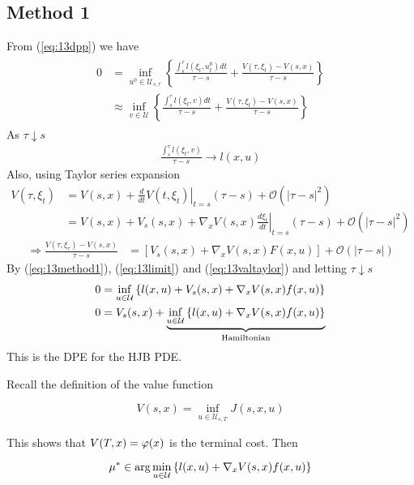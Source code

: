 \subsection{Method 1}
From (\ref{eq:13dpp}) we have
\begin{align}
\label{eq:13method1}
\begin{split}
0 &= \inf_{u^0\in\mathcal{U}_{s,\tau}} \left\lbrace \frac{\int_s^\tau l(\xi_t,u_t^0)dt}{\tau-s} + \frac{V(\tau,\xi_t)-V(s,x)}{\tau-s} \right\rbrace \\
&\approx\inf_{v\in\mathcal{U}} \left\lbrace \frac{\int_s^\tau l(\xi_t,v)dt}{\tau-s} + \frac{V(\tau,\xi_t)-V(s,x)}{\tau-s} \right\rbrace
\end{split}
\end{align}
As $\tau\downarrow s$
\begin{align}
\label{eq:13limit}
\frac{\int_s^\tau l(\xi_t,v)}{\tau-s} \to l(x,u)
\end{align}
Also, using Taylor series expansion
\begin{align*}
V(\tau,\xi_t) &= V(s,x) + \left.\frac{d}{dt}V(t,\xi_t)\right|_{t=s}(\tau-s) + \mathcal{O}(|\tau-s|^2) \\
&= V(s,x) + V_s(s,x) + \nabla_x V(s,x) \left.\frac{d\xi_t}{dt}\right|_{t=s}(\tau-s) + \mathcal{O}(|\tau-s|^2)
\end{align*}
\begin{align}
\label{eq:13valtaylor}
\Rightarrow \frac{V(\tau,\xi_\tau)-V(s,x)}{\tau-s} &= \left[V_s(s,x) + \nabla_x V(s,x)F(x,u)\right] + \mathcal{O}(|\tau-s|)
\end{align}
By (\ref{eq:13method1}), (\ref{eq:13limit}) and (\ref{eq:13valtaylor}) and letting $\tau\downarrow s$
\begin{align*}
0 &= \inf_{u\in\mathcal{U}} \left\lbrace l(x,u) + V_s(s,x) + \nabla_x V(s,x)f(x,u) \right\rbrace \\
0 &= V_s(s,x) + \underbrace{\inf_{u\in\mathcal{U}} \left\lbrace l(x,u) + \nabla_x V(s,x)f(x,u) \right\rbrace}_{\text{Hamiltonian}}
\end{align*}
This is the DPE for the HJB PDE\@.

Recall the definition of the value function

\begin{equation*}
V(s,x) = \inf_{u\in\mathcal{U}_{s,T}} J(s,x,u)
\end{equation*}

This shows that $V(T,x) = \varphi(x)$ is the terminal cost.
Then

\begin{equation*}
\mu^\ast \in \arg\min_{u\in\mathcal{U}} \left\lbrace l(x,u) + \nabla_x V(s,x) f(x,u) \right\rbrace
\end{equation*}


